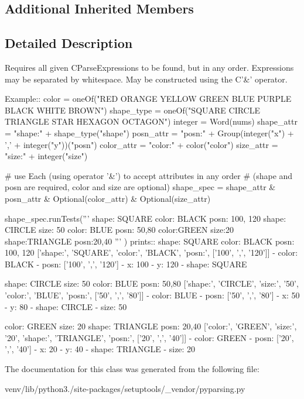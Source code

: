 \subsection*{Additional Inherited Members}


\subsection{Detailed Description}
\begin{DoxyVerb}Requires all given C{ParseExpression}s to be found, but in any order.
Expressions may be separated by whitespace.
May be constructed using the C{'&'} operator.

Example::
    color = oneOf("RED ORANGE YELLOW GREEN BLUE PURPLE BLACK WHITE BROWN")
    shape_type = oneOf("SQUARE CIRCLE TRIANGLE STAR HEXAGON OCTAGON")
    integer = Word(nums)
    shape_attr = "shape:" + shape_type("shape")
    posn_attr = "posn:" + Group(integer("x") + ',' + integer("y"))("posn")
    color_attr = "color:" + color("color")
    size_attr = "size:" + integer("size")

    # use Each (using operator '&') to accept attributes in any order 
    # (shape and posn are required, color and size are optional)
    shape_spec = shape_attr & posn_attr & Optional(color_attr) & Optional(size_attr)

    shape_spec.runTests('''
        shape: SQUARE color: BLACK posn: 100, 120
        shape: CIRCLE size: 50 color: BLUE posn: 50,80
        color:GREEN size:20 shape:TRIANGLE posn:20,40
        '''
        )
prints::
    shape: SQUARE color: BLACK posn: 100, 120
    ['shape:', 'SQUARE', 'color:', 'BLACK', 'posn:', ['100', ',', '120']]
    - color: BLACK
    - posn: ['100', ',', '120']
      - x: 100
      - y: 120
    - shape: SQUARE


    shape: CIRCLE size: 50 color: BLUE posn: 50,80
    ['shape:', 'CIRCLE', 'size:', '50', 'color:', 'BLUE', 'posn:', ['50', ',', '80']]
    - color: BLUE
    - posn: ['50', ',', '80']
      - x: 50
      - y: 80
    - shape: CIRCLE
    - size: 50


    color: GREEN size: 20 shape: TRIANGLE posn: 20,40
    ['color:', 'GREEN', 'size:', '20', 'shape:', 'TRIANGLE', 'posn:', ['20', ',', '40']]
    - color: GREEN
    - posn: ['20', ',', '40']
      - x: 20
      - y: 40
    - shape: TRIANGLE
    - size: 20
\end{DoxyVerb}
 

The documentation for this class was generated from the following file\+:\begin{DoxyCompactItemize}
\item 
venv/lib/python3./site-\/packages/setuptools/\+\_\+vendor/pyparsing.\+py\end{DoxyCompactItemize}
